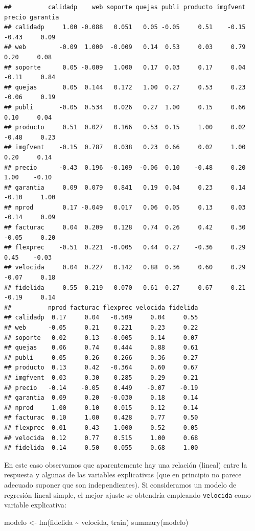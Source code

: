 \documentclass[
]{book}
\newenvironment{Shaded}{\begin{snugshade}}{\end{snugshade}}
\newcommand{\FunctionTok}[1]{\textcolor[rgb]{0.00,0.00,0.00}{#1}}
\newcommand{\NormalTok}[1]{#1}
\newcommand{\OtherTok}[1]{\textcolor[rgb]{0.56,0.35,0.01}{#1}}
\newcommand{\SpecialCharTok}[1]{\textcolor[rgb]{0.00,0.00,0.00}{#1}}
\theoremstyle{break}
\theoremstyle{definition}
\theoremstyle{definition}
\theoremstyle{definition}
\theoremstyle{definition}
\theoremstyle{remark}
\begin{document}
\begin{verbatim}
##          calidadp    web soporte quejas publi producto imgfvent precio garantia
## calidadp     1.00 -0.088   0.051   0.05 -0.05     0.51    -0.15  -0.43     0.09
## web         -0.09  1.000  -0.009   0.14  0.53     0.03     0.79   0.20     0.08
## soporte      0.05 -0.009   1.000   0.17  0.03     0.17     0.04  -0.11     0.84
## quejas       0.05  0.144   0.172   1.00  0.27     0.53     0.23  -0.06     0.19
## publi       -0.05  0.534   0.026   0.27  1.00     0.15     0.66   0.10     0.04
## producto     0.51  0.027   0.166   0.53  0.15     1.00     0.02  -0.48     0.23
## imgfvent    -0.15  0.787   0.038   0.23  0.66     0.02     1.00   0.20     0.14
## precio      -0.43  0.196  -0.109  -0.06  0.10    -0.48     0.20   1.00    -0.10
## garantia     0.09  0.079   0.841   0.19  0.04     0.23     0.14  -0.10     1.00
## nprod        0.17 -0.049   0.017   0.06  0.05     0.13     0.03  -0.14     0.09
## facturac     0.04  0.209   0.128   0.74  0.26     0.42     0.30  -0.05     0.20
## flexprec    -0.51  0.221  -0.005   0.44  0.27    -0.36     0.29   0.45    -0.03
## velocida     0.04  0.227   0.142   0.88  0.36     0.60     0.29  -0.07     0.18
## fidelida     0.55  0.219   0.070   0.61  0.27     0.67     0.21  -0.19     0.14
##          nprod facturac flexprec velocida fidelida
## calidadp  0.17     0.04   -0.509     0.04     0.55
## web      -0.05     0.21    0.221     0.23     0.22
## soporte   0.02     0.13   -0.005     0.14     0.07
## quejas    0.06     0.74    0.444     0.88     0.61
## publi     0.05     0.26    0.266     0.36     0.27
## producto  0.13     0.42   -0.364     0.60     0.67
## imgfvent  0.03     0.30    0.285     0.29     0.21
## precio   -0.14    -0.05    0.449    -0.07    -0.19
## garantia  0.09     0.20   -0.030     0.18     0.14
## nprod     1.00     0.10    0.015     0.12     0.14
## facturac  0.10     1.00    0.428     0.77     0.50
## flexprec  0.01     0.43    1.000     0.52     0.05
## velocida  0.12     0.77    0.515     1.00     0.68
## fidelida  0.14     0.50    0.055     0.68     1.00
\end{verbatim}

En este caso observamos que aparentemente hay una relación (lineal) entre la respuesta y algunas de las variables explicativas (que en principio no parece adecuado suponer que son independientes).
Si consideramos un modelo de regresión lineal simple, el mejor ajuste se obtendría empleando \texttt{velocida} como variable explicativa:

\begin{Shaded}
\begin{Highlighting}[]
\NormalTok{modelo }\OtherTok{\textless{}{-}} \FunctionTok{lm}\NormalTok{(fidelida }\SpecialCharTok{\textasciitilde{}}\NormalTok{ velocida, train)}
\FunctionTok{summary}\NormalTok{(modelo)}
\end{Highlighting}
\end{Shaded}
\end{document}
